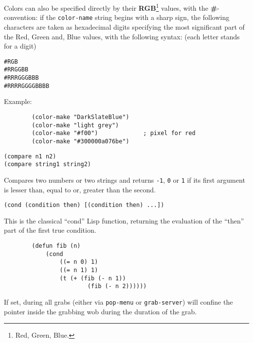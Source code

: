 Colors can also be specified directly by their {\bf RGB}\footnote{Red,
Green, Blue.} values, with the {\bf\#}-convention: if the \verb"color-name"
string begins with a sharp sign, the following characters are taken as
hexadecimal digits specifying the most significant part of the Red, Green
and, Blue values, with the following syntax: (each letter stands for a digit)

\begin{verbatim}
#RGB
#RRGGBB
#RRRGGGBBB
#RRRRGGGGBBBB
\end{verbatim}

Example:{\exemplefont\upspace\begin{verbatim}
        (color-make "DarkSlateBlue")
        (color-make "light grey")
        (color-make "#f00")             ; pixel for red
        (color-make "#300000a076be")
\end{verbatim}}


{\usagefont\begin{verbatim}
(compare n1 n2)
(compare string1 string2)
\end{verbatim}}\usageupspace

Compares two numbers or two strings and returns \verb"-1", \verb"0" or
\verb"1" if its first argument is lesser than, equal to or, greater than the
second.

        
{\usagefont\begin{verbatim}
(cond (condition then) [(condition then) ...])
\end{verbatim}}\usageupspace

This is the classical ``cond'' Lisp function, returning the evaluation of the
``then'' part of the first true condition.

{\exemplefont\begin{verbatim}
        (defun fib (n)
            (cond
                ((= n 0) 1)
                ((= n 1) 1)
                (t (+ (fib (- n 1)) 
                        (fib (- n 2))))))
\end{verbatim}}



If set, during all grabs (either via \verb"pop-menu" or \verb"grab-server")
will confine the pointer inside the grabbing wob during the duration of
the grab.

